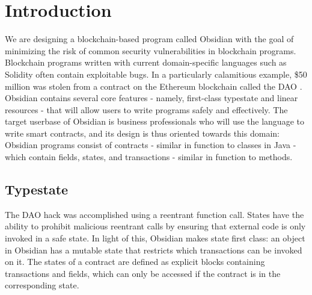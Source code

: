 \documentclass[sigplan,10pt,review]{acmart}\settopmatter{printfolios=true}
\begin{document}
\section{Introduction}


We are designing a blockchain-based program called Obsidian \cite{Coblenz} with the goal of 
minimizing the risk of common security vulnerabilities in blockchain programs. Blockchain
programs written with current domain-specific languages such as Solidity \cite{Solidity} often contain
exploitable bugs. In a particularly calamitious example, \$50 million was stolen from a contract on the 
Ethereum blockchain called the DAO \cite{Sirer}. Obsidian contains several core features
 - namely, first-class typestate and linear resources - that will allow users 
to write programs safely and effectively. The target 
userbase of Obsidian is business professionals who will use the language to write smart contracts, 
and its design is thus oriented towards this domain: Obsidian programs consist of contracts -
similar in function to classes in Java - which contain fields, states, and transactions - similar in
function to methods.

\subsection{Typestate}

The DAO hack was accomplished using a reentrant function call. States have the ability to 
prohibit malicious reentrant calls by ensuring that external code is only invoked in a safe state. 
In light of this, Obsidian makes state first class: an object in Obsidian has a mutable state that restricts which 
transactions can be invoked on it. The states of a contract are defined as explicit blocks containing 
transactions and fields, which can only be accessed if the contract is in the corresponding state. 
\end{document}
